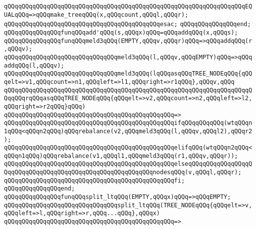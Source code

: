 \verb|qQQqqQQqqQQqqQQqqQQqqQQqqQQqqQQqqQQqqQQqqQQqqQQqqQQqqQQqqQQqqQQqqQQqEQUALqQQq=>qQQqmake_treeqQQq(x,qQQqcount,qQQql,qQQqr);|\newline
\verb|qQQqqQQqqQQqqQQqqQQqqQQqqQQqqQQqqQQqqQQqqQQqesac;|\newline
\verb|qQQqqQQqqQQqqQQqend;|\newline
\newline
\verb|qQQqqQQqqQQqqQQqfunqQQqadd'qQQq(s,qQQqx)qQQq=qQQqaddqQQq(x,qQQqs);|\newline
\newline
\verb|qQQqqQQqqQQqqQQqfunqQQqmeld3qQQq(EMPTY,qQQqv,qQQqr)qQQq=>qQQqaddqQQq(r,qQQqv);|\newline
\verb|qQQqqQQqqQQqqQQqqQQqqQQqqQQqqQQqmeld3qQQq(l,qQQqv,qQQqEMPTY)qQQq=>qQQqaddqQQq(l,qQQqv);|\newline
\newline
\verb|qQQqqQQqqQQqqQQqqQQqqQQqqQQqqQQqmeld3qQQq(lqQQqasqQQqTREE_NODEqQQq{qQQqelt=>v1,qQQqcount=>n1,qQQqleft=>l1,qQQqright=>r1qQQq},qQQqv,qQQq|\newline
\verb|qQQqqQQqqQQqqQQqqQQqqQQqqQQqqQQqqQQqqQQqqQQqqQQqqQQqqQQqqQQqqQQqqQQqqQQqqQQqrqQQqasqQQqTREE_NODEqQQq{qQQqelt=>v2,qQQqcount=>n2,qQQqleft=>l2,qQQqright=>r2qQQq}qQQq)|\newline
\verb|qQQqqQQqqQQqqQQqqQQqqQQqqQQqqQQqqQQqqQQqqQQqqQQq=>|\newline
\verb|qQQqqQQqqQQqqQQqqQQqqQQqqQQqqQQqqQQqqQQqqQQqqQQqifqQQqqQQqqQQq(wtqQQqn1qQQq<qQQqn2qQQq)qQQqrebalance(v2,qQQqmeld3qQQq(l,qQQqv,qQQql2),qQQqr2);|\newline
\verb|qQQqqQQqqQQqqQQqqQQqqQQqqQQqqQQqqQQqqQQqqQQqqQQqelifqQQq(wtqQQqn2qQQq<qQQqn1qQQq)qQQqrebalance(v1,qQQql1,qQQqmeld3qQQq(r1,qQQqv,qQQqr));|\newline
\verb|qQQqqQQqqQQqqQQqqQQqqQQqqQQqqQQqqQQqqQQqqQQqqQQqelseqQQqqQQqqQQqqQQqqQQqqQQqqQQqqQQqqQQqqQQqqQQqqQQqqQQqqQQqqQQqnodesqQQq(v,qQQql,qQQqr);|\newline
\verb|qQQqqQQqqQQqqQQqqQQqqQQqqQQqqQQqqQQqqQQqqQQqqQQqfi;|\newline
\verb|qQQqqQQqqQQqqQQqend;|\newline
\newline
\verb|qQQqqQQqqQQqqQQqfunqQQqsplit_ltqQQq(EMPTY,qQQqx)qQQq=>qQQqEMPTY;|\newline
\newline
\verb|qQQqqQQqqQQqqQQqqQQqqQQqqQQqqQQqsplit_ltqQQq(TREE_NODEqQQq{qQQqelt=>v,qQQqleft=>l,qQQqright=>r,qQQq...qQQq},qQQqx)|\newline
\verb|qQQqqQQqqQQqqQQqqQQqqQQqqQQqqQQqqQQqqQQqqQQqqQQq=>|\newline
